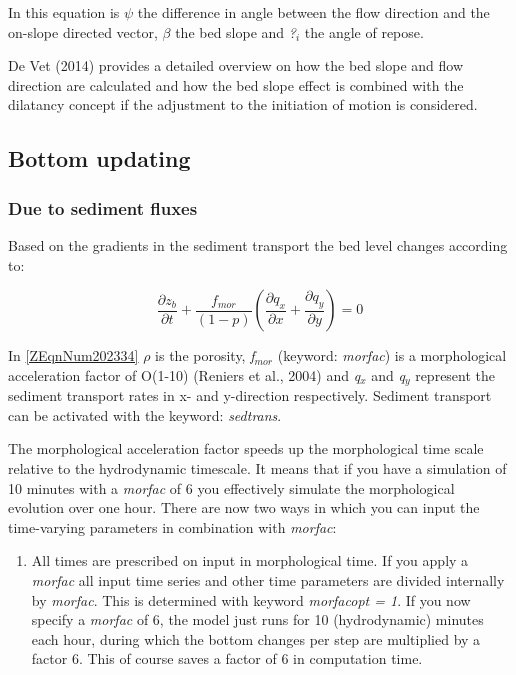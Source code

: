 \documentclass{article}
\begin{document}
\noindent In this equation is \textit{$\psi $ }the difference in angle between the flow direction and the on-slope directed vector, \textit{$\beta $} the bed slope and \textit{?${}_{i}$} the angle of repose. \textit{}

\noindent \textit{}

\noindent De Vet (2014) provides a detailed overview on how the bed slope and flow direction are calculated and how the bed slope effect is combined with the dilatancy concept if the adjustment to the initiation of motion is considered. 


\subsection{ Bottom updating}


\subsubsection{ Due to sediment fluxes}

\noindent Based on the gradients in the sediment transport the bed level changes according to:

\noindent 
\begin{equation} \label{ZEqnNum202334} 
\frac{\partial z_{b} }{\partial t} +\frac{f_{mor} }{\left(1-p\right)} \left(\frac{\partial q_{x} }{\partial x} +\frac{\partial q_{y} }{\partial y} \right)=0 
\end{equation} 


\noindent In \eqref{ZEqnNum202334} \textit{$\rho $} is the porosity, \textit{f${}_{mor}$} (keyword: \textit{morfac}) is a morphological acceleration factor of O(1-10) (Reniers et al., 2004) and \textit{q${}_{x}$} and \textit{q${}_{y}$} represent the sediment transport rates in x- and y-direction respectively. Sediment transport can be activated with the keyword: \textit{sedtrans}. 

\noindent 

\noindent The morphological acceleration factor speeds up the morphological time scale relative to the hydrodynamic timescale. It means that if you have a simulation of 10 minutes with a \textit{morfac} of 6 you effectively simulate the morphological evolution over one hour. There are now two ways in which you can input the time-varying parameters in combination with \textit{morfac}:

\noindent 

\begin{enumerate}
\item  All times are prescribed on input in morphological time. If you apply a \textit{morfac} all input time series and other time parameters are divided internally by \textit{morfac}. This is determined with keyword\textit{ morfacopt = 1}. If you now specify a \textit{morfac} of 6, the model just runs for 10 (hydrodynamic) minutes each hour, during which the bottom changes per step are multiplied by a factor 6. This of course saves a factor of 6 in computation time.
\end{enumerate}
\end{document}
